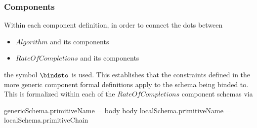\documentclass[../main.tex]{subfiles}
\begin{document}
\subsubsection{Components}
Within each component definition, in order to connect the dots between
\begin{itemize}
  \item $Algorithm$ and its components
  \item $RateOfCompletions$ and its components
\end{itemize}
the symbol $\bindsto$ is used. This establishes that the constraints defined in the more generic
component formal definitions apply to the schema being binded to. This is formalized within each of
the $RateOfCompletions$ component schemas via
\begin{axdef}
  genericSchema.primitiveName = \langle body \rangle
  \where
  \langle body \rangle \bindsto localSchema.primitiveName = localSchema.primitiveChain
\end{axdef}
\end{document}
